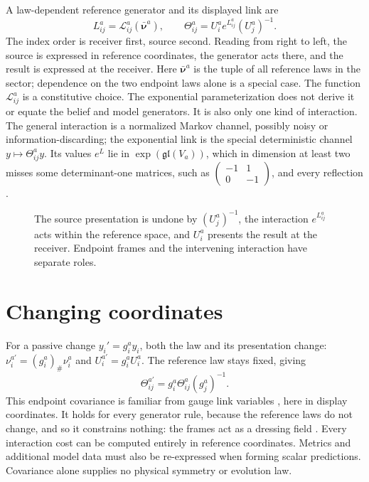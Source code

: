 A law-dependent reference generator and its displayed link are
\begin{equation}
L_{ij}^a=\mathcal L_{ij}^a(\bar{\boldsymbol\nu}^a),\qquad
\Theta_{ij}^a=U_i^a e^{L_{ij}^a}(U_j^a)^{-1}.
\label{eq:comp-link}
\end{equation}
The index order is receiver first, source second. Reading from right to left, the source is expressed in reference coordinates, the generator acts there, and the result is expressed at the receiver. Here $\bar{\boldsymbol\nu}^a$ is the tuple of all reference laws in the sector; dependence on the two endpoint laws alone is a special case. The function $\mathcal L_{ij}^a$ is a constitutive choice. The exponential parameterization does not derive it or equate the belief and model generators. It is also only one kind of interaction. The general interaction is a normalized Markov channel, possibly noisy or information-discarding; the exponential link is the special deterministic channel $y\mapsto\Theta_{ij}^ay$. Its values $e^{L}$ lie in $\exp(\mathfrak{gl}(V_a))$, which in dimension at least two misses some determinant-one matrices, such as $\begin{pmatrix}-1&1\\0&-1\end{pmatrix}$, and every reflection \citep{Culver1966}.

\begin{figure}[htbp]
\centering

\caption{The source presentation is undone by $(U_j^a)^{-1}$, the interaction $e^{L_{ij}^a}$ acts within the reference space, and $U_i^a$ presents the result at the receiver. Endpoint frames and the intervening interaction have separate roles.}
\label{fig:comp-link}
\end{figure}

\section{Changing coordinates}

For a passive change $y_i'=g_i^a y_i$, both the law and its presentation change: $\nu_i^{a\prime}=(g_i^a)_\#\nu_i^a$ and $U_i^{a\prime}=g_i^aU_i^a$. The reference law stays fixed, giving
\begin{equation}
\Theta_{ij}^{a\prime}=g_i^a\Theta_{ij}^a(g_j^a)^{-1}.
\end{equation}
This endpoint covariance is familiar from gauge link variables \citep{Wilson1974}, here in display coordinates. It holds for every generator rule, because the reference laws do not change, and so it constrains nothing: the frames act as a dressing field \citep{FournelEtAl2014}. Every interaction cost can be computed entirely in reference coordinates. Metrics and additional model data must also be re-expressed when forming scalar predictions. Covariance alone supplies no physical symmetry or evolution law.

